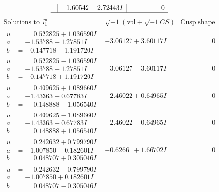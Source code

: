 \documentclass[1p]{elsarticle_modified}
\theoremstyle{definition}
\newcommand{\I}{\sqrt{-1}}
\begin{document}
$$\begin{array}{c|c|c}
 & -1.60542 - 2.72443 I & \phantom{-0.000000 } 0\\
 \hline 
 \end{array}$$\newpage$$\begin{array}{c|c|c}  
\text{Solutions to }I^u_{1}& \I (\text{vol} + \sqrt{-1}CS) & \text{Cusp shape}\\
 \hline 
\begin{aligned}
u &= \phantom{-}0.522825 + 1.036590 I \\
a &= -1.53788 + 1.27851 I \\
b &= -0.147718 - 1.191720 I\end{aligned}
 & -3.06127 + 3.60117 I & \phantom{-0.000000 } 0 \\ \hline\begin{aligned}
u &= \phantom{-}0.522825 - 1.036590 I \\
a &= -1.53788 - 1.27851 I \\
b &= -0.147718 + 1.191720 I\end{aligned}
 & -3.06127 - 3.60117 I & \phantom{-0.000000 } 0 \\ \hline\begin{aligned}
u &= \phantom{-}0.409625 + 1.089660 I \\
a &= -1.43363 + 0.67783 I \\
b &= \phantom{-}0.148888 - 1.056540 I\end{aligned}
 & -2.46022 + 0.64965 I & \phantom{-0.000000 } 0 \\ \hline\begin{aligned}
u &= \phantom{-}0.409625 - 1.089660 I \\
a &= -1.43363 - 0.67783 I \\
b &= \phantom{-}0.148888 + 1.056540 I\end{aligned}
 & -2.46022 - 0.64965 I & \phantom{-0.000000 } 0 \\ \hline\begin{aligned}
u &= \phantom{-}0.242632 + 0.799790 I \\
a &= -1.007850 - 0.182601 I \\
b &= \phantom{-}0.048707 + 0.305046 I\end{aligned}
 & -0.62661 + 1.66702 I & \phantom{-0.000000 } 0 \\ \hline\begin{aligned}
u &= \phantom{-}0.242632 - 0.799790 I \\
a &= -1.007850 + 0.182601 I \\
b &= \phantom{-}0.048707 - 0.305046 I\end{aligned}

\end{array}$$
\end{document}
